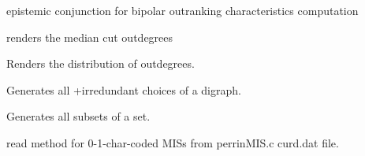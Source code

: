 \documentclass[letterpaper,10pt,english]{sphinxmanual}
\begin{document}
\begin{fulllineitems}
\begin{fulllineitems}
\end{fulllineitems}


\begin{fulllineitems}
\label{techDoc:digraphs.Digraph.omin}
epistemic conjunction for bipolar outranking characteristics
computation

\end{fulllineitems}


\begin{fulllineitems}
\label{techDoc:digraphs.Digraph.outDegrees}
renders the median cut outdegrees

\end{fulllineitems}


\begin{fulllineitems}
\label{techDoc:digraphs.Digraph.outDegreesDistribution}
Renders the distribution of outdegrees.

\end{fulllineitems}


\begin{fulllineitems}
\label{techDoc:digraphs.Digraph.plusirredundant}
Generates all +irredundant choices of a digraph.

\end{fulllineitems}


\begin{fulllineitems}
\label{techDoc:digraphs.Digraph.powerset}
Generates all subsets of a set.

\end{fulllineitems}


\begin{fulllineitems}
\label{techDoc:digraphs.Digraph.readPerrinMisset}
read method for 0-1-char-coded MISs from perrinMIS.c curd.dat file.


\end{fulllineitems}
\end{fulllineitems}
\end{document}
